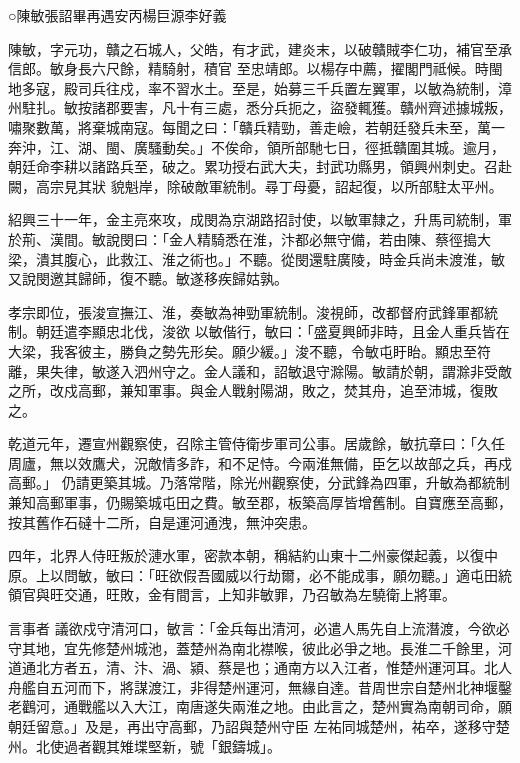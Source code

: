
\begin{pinyinscope}

 ○陳敏張詔畢再遇安丙楊巨源李好義



 陳敏，字元功，贛之石城人，父皓，有才武，建炎末，以破贛賊李仁功，補官至承信郎。敏身長六尺餘，精騎射，積官
 至忠靖郎。以楊存中薦，擢閣門祗候。時閩地多寇，殿司兵往戍，率不習水土。至是，始募三千兵置左翼軍，以敏為統制，漳州駐扎。敏按諸郡要害，凡十有三處，悉分兵扼之，盜發輒獲。贛州齊述據城叛，嘯聚數萬，將棄城南寇。每聞之曰：「贛兵精勁，善走嶮，若朝廷發兵未至，萬一奔沖，江、湖、閩、廣騷動矣。」不俟命，領所部馳七日，徑抵贛圍其城。逾月，朝廷命李耕以諸路兵至，破之。累功授右武大夫，封武功縣男，領興州刺史。召赴闕，高宗見其狀
 貌魁岸，除破敵軍統制。尋丁母憂，詔起復，以所部駐太平州。



 紹興三十一年，金主亮來攻，成閔為京湖路招討使，以敏軍隸之，升馬司統制，軍於荊、漢間。敏說閔曰：「金人精騎悉在淮，汴都必無守備，若由陳、蔡徑搗大梁，潰其腹心，此救江、淮之術也。」不聽。從閔還駐廣陵，時金兵尚未渡淮，敏又說閔邀其歸師，復不聽。敏遂移疾歸姑孰。



 孝宗即位，張浚宣撫江、淮，奏敏為神勁軍統制。浚視師，改都督府武鋒軍都統制。朝廷遣李顯忠北伐，浚欲
 以敏偕行，敏曰：「盛夏興師非時，且金人重兵皆在大梁，我客彼主，勝負之勢先形矣。願少緩。」浚不聽，令敏屯盱眙。顯忠至符離，果失律，敏遂入泗州守之。金人議和，詔敏退守滁陽。敏請於朝，謂滁非受敵之所，改戍高郵，兼知軍事。與金人戰射陽湖，敗之，焚其舟，追至沛城，復敗之。



 乾道元年，遷宣州觀察使，召除主管侍衛步軍司公事。居歲餘，敏抗章曰：「久任周廬，無以效鷹犬，況敵情多詐，和不足恃。今兩淮無備，臣乞以故部之兵，再戍高郵。」
 仍請更築其城。乃落常階，除光州觀察使，分武鋒為四軍，升敏為都統制兼知高郵軍事，仍賜築城屯田之費。敏至郡，板築高厚皆增舊制。自寶應至高郵，按其舊作石䃮十二所，自是運河通洩，無沖突患。



 四年，北界人侍旺叛於漣水軍，密款本朝，稱結約山東十二州豪傑起義，以復中原。上以問敏，敏曰：「旺欲假吾國威以行劫爾，必不能成事，願勿聽。」適屯田統領官與旺交通，旺敗，金有間言，上知非敏罪，乃召敏為左驍衛上將軍。



 言事者
 議欲戍守清河口，敏言：「金兵每出清河，必遣人馬先自上流潛渡，今欲必守其地，宜先修楚州城池，蓋楚州為南北襟喉，彼此必爭之地。長淮二千餘里，河道通北方者五，清、汴、渦、潁、蔡是也；通南方以入江者，惟楚州運河耳。北人舟艦自五河而下，將謀渡江，非得楚州運河，無緣自達。昔周世宗自楚州北神堰鑿老鸛河，通戰艦以入大江，南唐遂失兩淮之地。由此言之，楚州實為南朝司命，願朝廷留意。」及是，再出守高郵，乃詔與楚州守臣
 左祐同城楚州，祐卒，遂移守楚州。北使過者觀其雉堞堅新，號「銀鑄城」。




\end{pinyinscope}
